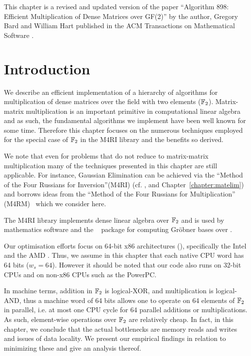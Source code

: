 This chapter is a revised and updated version of the paper ``Algorithm 898: Efficient Multiplication of Dense Matrices over GF(2)'' by the author, Gregory Bard and William Hart published in the ACM Transactions on Mathematical Software \cite{matmulgf2}.

\section{Introduction}
We describe an efficient implementation of a hierarchy of algorithms for multiplication of dense matrices over the field with two elements ($\mathbb{F}_2$). Ma\-trix-matrix multiplication is an important primitive in computational linear algebra and as such, the fundamental algorithms we implement have been well known for some time. Therefore this chapter focuses on the numerous techniques employed for the special case of $\mathbb{F}_2$ in the M4RI library \cite{M4RI} and the benefits so derived.

We note that even for problems that do not reduce to matrix-matrix multiplication many of the techniques presented in this chapter are still applicable. For instance, Gaussian Elimination can be achieved via the ``Method of the Four Russians for Inversion''(M4RI) (cf. \cite[Ch. 5]{bard-phd}, \cite{bard-m4ri} and Chapter~\ref{chapter:matelim}) and borrows ideas from the ``Method of the Four Russians for Multiplication'' (M4RM)~\cite{ADKF70,AHU74} which we consider here.

The M4RI library implements dense linear algebra over $\mathbb{F}_2$ and is used by \Sage \cite{sage} mathematics software and the \PolyBoRi~\cite{polybori} package for computing Gröbner bases over \GFZ.

Our optimisation efforts focus on 64-bit x86 architectures (\xBG), specifically the Intel \CTD and the AMD \Opteron. Thus, we assume in this chapter that each native CPU word has 64 bits ($w_s=64$). However it should be noted that our code also runs on 32-bit CPUs and on non-x86 CPUs such as the PowerPC.

In machine terms, addition in $\mathbb{F}_2$ is logical-XOR, and multiplication is logical-AND, thus a machine word of 64 bits allows one to operate on 64 elements of $\mathbb{F}_2$ in parallel, i.e. at most one CPU cycle for 64 parallel additions or multiplications. As such, element-wise operations over $\mathbb{F}_2$ are relatively cheap. In fact, in this chapter, we conclude that the actual bottlenecks are memory reads and writes and issues of data locality. We present our empirical findings in relation to minimizing these and give an analysis thereof.

